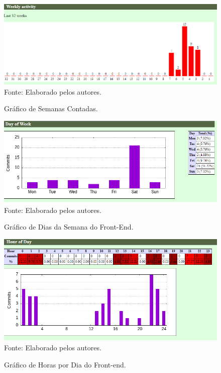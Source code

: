 \documentclass[
    12pt,               %
    openright,          %
    oneside,
    a4paper,            %
    BIBLATEX,           %
    TODO,               %
    english,            %
    brazil              %
    ]{ifsp-spo-inf-ctds}
\begin{document}
    \begin{figure}[H]
                \centering
                \caption{Gráfico de Semanas Contadas.}
                \includegraphics[width=1 \textwidth]{Gitstats/front-end/SemanasFront.png}
                {\footnotesize Fonte: Elaborado pelos autores.}
                \label{fig:semanasFront}
            \end{figure}
            
            \begin{figure}[H]
                \centering
                \caption{Gráfico de Dias da Semana do Front-End.}
                \includegraphics[width=1 \textwidth]{Gitstats/front-end/DiasdaSemana.png}
                {\footnotesize Fonte: Elaborado pelos autores.}
                \label{fig:diasemanaFront}
            \end{figure}
            
            \begin{figure}[H]
                \centering
                \caption{Gráfico de Horas por Dia do Front-end.}
                \includegraphics[width=1 \textwidth]{Gitstats/front-end/HorasdoDia.png}
                {\footnotesize Fonte: Elaborado pelos autores.}
                \label{fig:horasFront}
            \end{figure}
            
\end{document}
